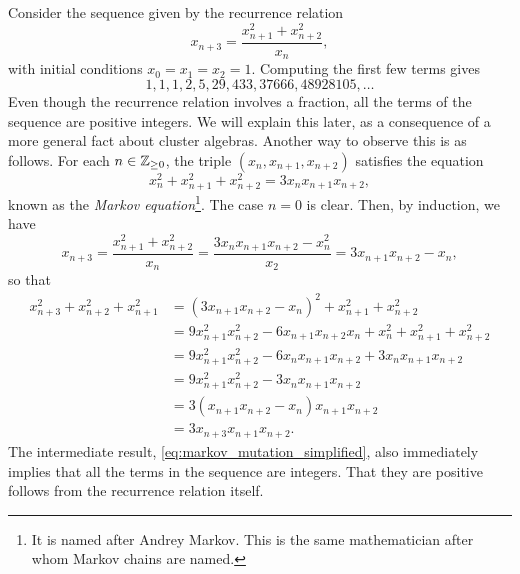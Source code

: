 \begin{example}\label{exmp:markov_sequence}
	Consider the sequence given by the recurrence relation
	\begin{equation*}
		x_{n+3} = \frac{x_{n+1}^2 + x_{n+2}^2}{x_n},
	\end{equation*}
	with initial conditions $x_0 = x_1 = x_2 = 1$. Computing the first few terms gives
	\begin{equation*}
		1,1,1,2,5,29,433,37666,48928105,\dots
	\end{equation*}
	Even though the recurrence relation involves a fraction, all the terms of the sequence
	are positive integers. We will explain this later, as a consequence of a more general
	fact about cluster algebras. Another way to observe this is as follows. For each $n \in
		\mathbb{Z}_{\geq0}$, the triple $(x_n, x_{n+1}, x_{n+2})$ satisfies the equation
	\begin{equation}\label{eq:markov_diophantine}
		x_n^2 + x_{n+1}^2 + x_{n+2}^2 = 3 x_n x_{n+1}x_{n+2},
	\end{equation}
	known as the \emph{Markov equation}\footnote{It is named after Andrey Markov. This is the same mathematician after whom Markov chains are named.}. The case $n = 0$ is clear. Then, by induction, we have
	\begin{equation}\label{eq:markov_mutation_simplified}
		x_{n+3} = \frac{x_{n+1}^2 + x_{n+2}^2}{x_n} = \frac{3 x_n x_{n+1}x_{n+2} - x_n^2}{x_2} = 3 x_{n+1} x_{n+2} - x_n,
	\end{equation}
	so that
	\begin{align*}
		x_{n+3}^2 + x_{n+2}^2 + x_{n+1}^2
		 & = (3 x_{n+1}x_{n+2} - x_n)^2 + x_{n+1}^2 + x_{n+2}^2                            \\
		 & = 9 x_{n+1}^2 x_{n+2}^2 - 6 x_{n+1} x_{n+2} x_n + x_n^2 + x_{n+1}^2 + x_{n+2}^2 \\
		 & = 9 x_{n+1}^2 x_{n+2}^2 - 6 x_n x_{n+1} x_{n+2} + 3 x_n x_{n+1} x_{n+2}         \\
		 & = 9 x_{n+1}^2 x_{n+2}^2 - 3 x_n x_{n+1} x_{n+2}                                 \\
		 & = 3 ( x_{n+1} x_{n+2}-  x_n) x_{n+1} x_{n+2}                                    \\
		 & = 3 x_{n+3} x_{n+1} x_{n+2}.
	\end{align*}
	The intermediate result, \cref{eq:markov_mutation_simplified}, also immediately implies
	that all the terms in the sequence are integers. That they are positive follows from
	the recurrence relation itself.
\end{example}

